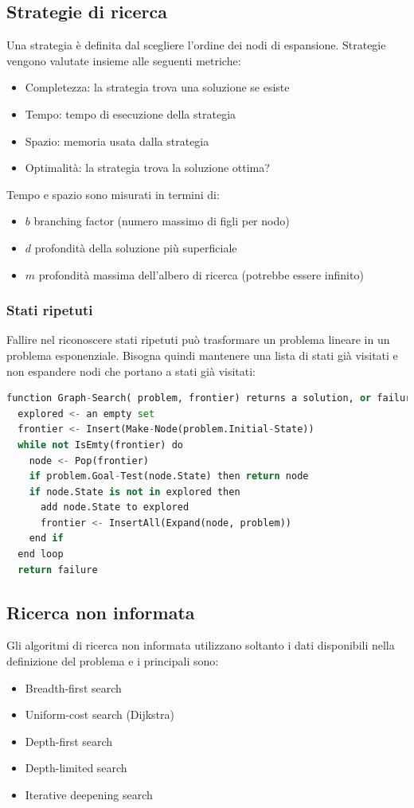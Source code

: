 \documentclass[a4paper]{article}
\begin{document}
\subsection{Strategie di ricerca}

Una strategia è definita dal scegliere l'ordine dei nodi di espansione.
Strategie vengono valutate insieme alle seguenti metriche:
\begin{itemize}
    \item Completezza: la strategia trova una soluzione se esiste
    \item Tempo: tempo di esecuzione della strategia
    \item Spazio: memoria usata dalla strategia
    \item Optimalità: la strategia trova la soluzione ottima?
\end{itemize}
Tempo e spazio sono misurati in termini di:
\begin{itemize}
    \item $b$ branching factor (numero massimo di figli per nodo)
    \item $d$ profondità della soluzione più superficiale
    \item $m$ profondità massima dell'albero di ricerca (potrebbe essere infinito)
\end{itemize}

\subsubsection{Stati ripetuti}
Fallire nel riconoscere stati ripetuti può trasformare un problema lineare in un problema
esponenziale. Bisogna quindi mantenere una lista di stati già visitati e non espandere
nodi che portano a stati già visitati:
\begin{lstlisting}[language=Python]
function Graph-Search( problem, frontier) returns a solution, or failure
  explored <- an empty set
  frontier <- Insert(Make-Node(problem.Initial-State))
  while not IsEmty(frontier) do
    node <- Pop(frontier)
    if problem.Goal-Test(node.State) then return node
    if node.State is not in explored then
      add node.State to explored
      frontier <- InsertAll(Expand(node, problem))
    end if
  end loop
  return failure
\end{lstlisting}

\subsection{Ricerca non informata}
Gli algoritmi di ricerca non informata utilizzano soltanto i dati disponibili nella
definizione del problema e i principali sono:
\begin{itemize}
  \item Breadth-first search
  \item Uniform-cost search (Dijkstra)
  \item Depth-first search
  \item Depth-limited search
  \item Iterative deepening search
\end{itemize}
\end{document}
